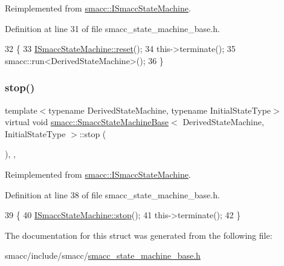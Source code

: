 Reimplemented from \hyperlink{classsmacc_1_1ISmaccStateMachine_a9e4b4fe4dda962642397993235c6eea0}{smacc\+::\+I\+Smacc\+State\+Machine}.



Definition at line 31 of file smacc\+\_\+state\+\_\+machine\+\_\+base.\+h.


\begin{DoxyCode}
32     \{
33         \hyperlink{classsmacc_1_1ISmaccStateMachine_a9e4b4fe4dda962642397993235c6eea0}{ISmaccStateMachine::reset}();
34         this->terminate();
35         smacc::run<DerivedStateMachine>();
36     \}
\end{DoxyCode}
\mbox{\label{structsmacc_1_1SmaccStateMachineBase_aaa9baa888888165998aa990ca299e30b}} 
\subsubsection{\texorpdfstring{stop()}{stop()}}
{\footnotesize\ttfamily template$<$typename Derived\+State\+Machine, typename Initial\+State\+Type$>$ \\
virtual void \hyperlink{structsmacc_1_1SmaccStateMachineBase}{smacc\+::\+Smacc\+State\+Machine\+Base}$<$ Derived\+State\+Machine, Initial\+State\+Type $>$\+::stop (\begin{DoxyParamCaption}{ }\end{DoxyParamCaption})\hspace{0.3cm}{\ttfamily [inline]}, {\ttfamily [override]}, {\ttfamily [virtual]}}



Reimplemented from \hyperlink{classsmacc_1_1ISmaccStateMachine_adcb1b55e014f982a713a863ffb0261d3}{smacc\+::\+I\+Smacc\+State\+Machine}.



Definition at line 38 of file smacc\+\_\+state\+\_\+machine\+\_\+base.\+h.


\begin{DoxyCode}
39     \{
40         \hyperlink{classsmacc_1_1ISmaccStateMachine_adcb1b55e014f982a713a863ffb0261d3}{ISmaccStateMachine::stop}();
41         this->terminate();
42     \}
\end{DoxyCode}


The documentation for this struct was generated from the following file\+:\begin{DoxyCompactItemize}
\item 
smacc/include/smacc/\hyperlink{smacc__state__machine__base_8h}{smacc\+\_\+state\+\_\+machine\+\_\+base.\+h}\end{DoxyCompactItemize}
